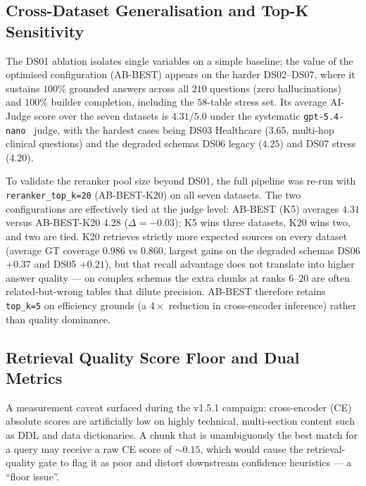 \subsection{Cross-Dataset Generalisation and Top-K Sensitivity}
\label{sec:eval:topk_sensitivity}

The DS01 ablation isolates single variables on a simple baseline; the value of the optimised configuration (AB-BEST) appears on the harder DS02--DS07, where it sustains $100\%$ grounded answers across all $210$ questions (zero hallucinations) and $100\%$ builder completion, including the $58$-table stress set. Its average AI-Judge score over the seven datasets is $4.31/5.0$ under the systematic \texttt{gpt-5.4-nano}~\cite{openai2024gpt54nano} judge, with the hardest cases being DS03 Healthcare ($3.65$, multi-hop clinical questions) and the degraded schemas DS06 legacy ($4.25$) and DS07 stress ($4.20$).

To validate the reranker pool size beyond DS01, the full pipeline was re-run with \texttt{reranker\_top\_k=20} (AB-BEST-K20) on all seven datasets. The two configurations are effectively tied at the judge level: AB-BEST (K5) averages $4.31$ versus AB-BEST-K20 $4.28$ ($\Delta = -0.03$); K5 wins three datasets, K20 wins two, and two are tied. K20 retrieves strictly more expected sources on every dataset (average GT coverage $0.986$ vs $0.860$, largest gains on the degraded schemas DS06 $+0.37$ and DS05 $+0.21$), but that recall advantage does not translate into higher answer quality --- on complex schemas the extra chunks at ranks 6--20 are often related-but-wrong tables that dilute precision. AB-BEST therefore retains \texttt{top\_k=5} on efficiency grounds (a $4\times$ reduction in cross-encoder inference) rather than quality dominance.

\subsection{Retrieval Quality Score Floor and Dual Metrics}
\label{sec:eval:dual_metrics}

A measurement caveat surfaced during the v1.5.1 campaign: cross-encoder (CE) absolute scores are artificially low on highly technical, multi-section content such as DDL and data dictionaries. A chunk that is unambiguously the best match for a query may receive a raw CE score of $\sim 0.15$, which would cause the retrieval-quality gate to flag it as poor and distort downstream confidence heuristics --- a ``floor issue''.


